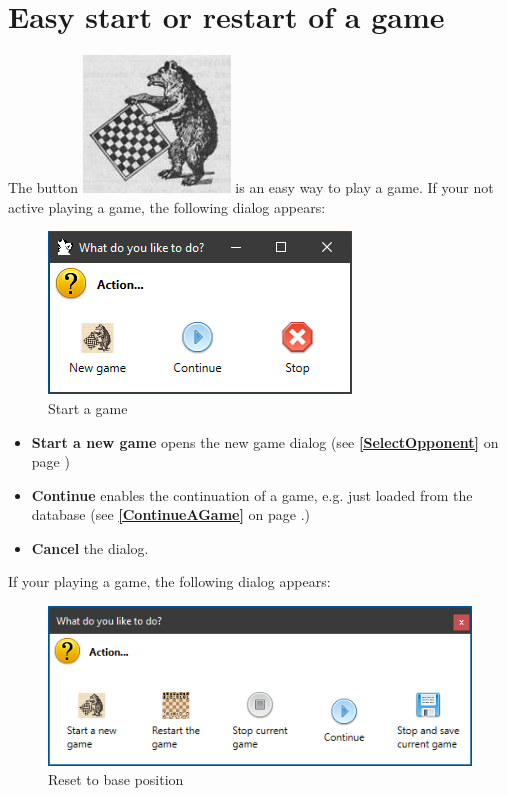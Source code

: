 \documentclass[11pt,a4paper]{article}
\begin{document}
\section{Easy start or restart of a game} \label{easyStart}

The button \includegraphics[scale=0.2]{bearchess_2.png} is an easy way to play a game. If your not active playing a game, the following dialog appears:

\begin{figure}[H]
	\centering
	\includegraphics[scale=1.0]{resetToBasePosition2.png}
	\caption{Start a game}
	\label{fig:resetToBasePosition2}
\end{figure}

\begin{itemize}
	\item \textbf{Start a new game} opens the new game dialog (see \textbf{\ref{SelectOpponent}  } on page \pageref{SelectOpponent})
	\item \textbf{Continue} enables the continuation of a game, e.g. just loaded from the database (see \textbf{\ref{ContinueAGame}  } on page \pageref{ContinueAGame}.)
	\item \textbf{Cancel} the dialog.
\end{itemize}

If your playing a game, the following dialog appears:

\begin{figure}[H]
	\centering
	\includegraphics[scale=0.9]{resetToBasePosition.png}
	\caption{Reset to base position}
	\label{fig:resetToBasePosition}
\end{figure}
\end{document}

